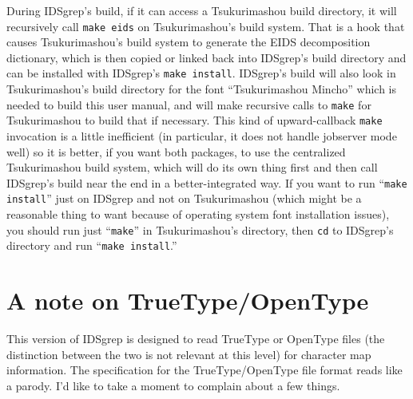 \documentclass[twocolumn]{report}
\newcommand{\DangerousSection}{\marginpar{\large\hfill
\raisebox{-0.5\baselineskip}[0pt][0pt]{\dbend}\hfill\null}}
\begin{document}
During IDSgrep's build, if it can access a Tsukurimashou build directory, it
will recursively call \texttt{make eids} on Tsukurimashou's build system. 
That is a hook that causes Tsukurimashou's build system to generate the EIDS
decomposition dictionary, which is then copied or linked back into IDSgrep's
build directory and can be installed with IDSgrep's \texttt{make install}. 
IDSgrep's build will also look in Tsukurimashou's build directory for the
font ``Tsukurimashou Mincho'' which is needed to build this user manual, and
will make recursive calls to \texttt{make} for Tsukurimashou to build that
if necessary.  This kind of upward-callback \texttt{make} invocation is a
little inefficient (in particular, it does not handle jobserver mode well)
so it is better, if you want both packages, to use the centralized
Tsukurimashou build system, which will do its own thing first and then call
IDSgrep's build near the end in a better-integrated way.  If you want to
run ``\texttt{make install}'' just on IDSgrep and not on Tsukurimashou
(which might be a reasonable thing to want because of operating system font
installation issues), you should run just ``\texttt{make}'' in
Tsukurimashou's directory, then \texttt{cd} to IDSgrep's directory and run
``\texttt{make install}.''


\break\vspace*{-1.82\baselineskip}%
\section{A note on TrueType/OpenType}\DangerousSection

This version of IDSgrep is designed to read TrueType or
OpenType files (the distinction between the two is not relevant at this
level) for character map information.  The specification for the
TrueType/OpenType file format reads like a parody.  I'd like to take a
moment to complain about a few things.
\end{document}
